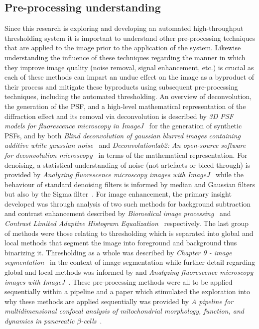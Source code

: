 \subsection*{Pre-processing understanding}
Since this research is exploring and developing an automated high-throughput thresholding system it is important to understand other pre-processing techniques that are applied to the image prior to the application of the system. Likewise understanding the influence of these techniques regarding the manner in which they improve image quality (noise removal, signal enhancement, etc.) is crucial as each of these methods can impart an undue effect on the image as a byproduct of their process and mitigate these byproducts using subsequent pre-processing techniques, including the automated thresholding. An overview of deconvolution, the generation of the PSF, and a high-level mathematical representation of the diffraction effect and its removal via deconvolution is described by \textit{3D PSF models for fluorescence microscopy in ImageJ}~\cite{psfgen} for the generation of synthetic PSFs, and by both \textit{Blind deconvolution of gaussian blurred images containing additive
white gaussian noise}~\cite{6505824} and \textit{Deconvolutionlab2: An open-source software for deconvolution microscopy}~\cite{DeconLab2} in terms of the mathematical representation. For denoising, a statistical understanding of noise (not artefacts or bleed-through) is provided by \textit{Analyzing fluorescence microscopy images with ImageJ}~\cite{bioimage_book} while the behaviour of standard denoising filters is informed by median and Gaussian filters but also by the Sigma filter~\cite{sigma_filter}. For image enhancement, the primary insight developed was through analysis of two such methods for background subtraction and contrast enhancement described by \textit{Biomedical image processing}~\cite{rolling_ball} and \textit{Contrast Limited Adaptive Histogram Equalization}~\cite{clahe} respectively. The last group of methods were those relating to thresholding which is separated into global and local methods that segment the image into foreground and background thus binarizing it. Thresholding as a whole was described by \textit{Chapter 9 - image segmentation}~\cite{segmentation_book} in the context of image segmentation while further detail regarding global and local methods was informed by \cite{Otsu1979ATS} and \textit{Analyzing fluorescence microscopy images with ImageJ}~\cite{bioimage_book}. These pre-processing methods were all to be applied sequentially within a pipeline and a paper which stimulated the exploration into why these methods are applied sequentially was provided by \textit{A pipeline for multidimensional confocal analysis of
mitochondrial morphology, function, and dynamics in pancreatic $\beta$-cells}~\cite{PipelineDecon-Chaudhry}.

